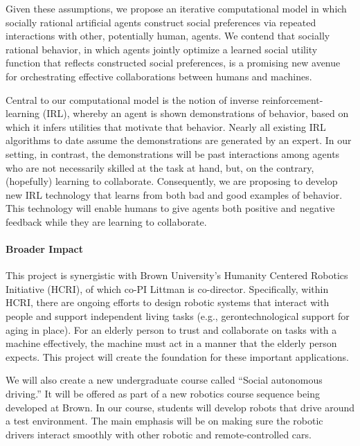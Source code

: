 Given these assumptions, we propose an iterative computational model
in which socially rational artificial agents construct social
preferences via repeated interactions with other, potentially human,
agents.  We contend that socially rational behavior, in which agents
jointly optimize a learned social utility function that reflects
constructed social preferences, is a promising new avenue for
orchestrating effective collaborations between humans and machines.

Central to our computational model is the notion of inverse
reinforcement-learning (IRL), whereby an agent is shown demonstrations
of behavior, based on which it infers utilities that motivate that
behavior.  Nearly all existing IRL algorithms to date assume the
demonstrations are generated by an expert.  In our setting, in
contrast, the demonstrations will be past interactions among agents
who are not necessarily skilled at the task at hand, but, on the
contrary, (hopefully) learning to collaborate.  Consequently, we are
proposing to develop new IRL technology that learns from
both bad and good examples of behavior.  This technology will enable
humans to give agents both positive and negative feedback while they
are learning to collaborate.




\vspace{\up}
\paragraph{Broader Impact}
%
This project is synergistic with Brown University's Humanity Centered
Robotics Initiative (HCRI), of which co-PI Littman is co-director.
Specifically, within HCRI, there are ongoing efforts to design robotic
systems that interact with people and support independent living tasks
(e.g., gerontechnological support for aging in place).  For an elderly
person to trust and collaborate on tasks with a machine effectively,
the machine must act in a manner that the elderly person expects.
This project will create the foundation for these important
applications.

We will also create a new undergraduate course called ``Social
autonomous driving.''  It will be offered as part of a new robotics
course sequence being developed at Brown.  In our course, students
will develop robots that drive around a test environment.  The main
emphasis will be on making sure the robotic drivers interact smoothly
with other robotic and remote-controlled cars.


